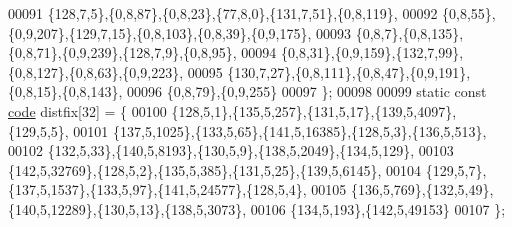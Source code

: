 \begin{DoxyCode}
00091         \{128,7,5\},\{0,8,87\},\{0,8,23\},\{77,8,0\},\{131,7,51\},\{0,8,119\},
00092         \{0,8,55\},\{0,9,207\},\{129,7,15\},\{0,8,103\},\{0,8,39\},\{0,9,175\},
00093         \{0,8,7\},\{0,8,135\},\{0,8,71\},\{0,9,239\},\{128,7,9\},\{0,8,95\},
00094         \{0,8,31\},\{0,9,159\},\{132,7,99\},\{0,8,127\},\{0,8,63\},\{0,9,223\},
00095         \{130,7,27\},\{0,8,111\},\{0,8,47\},\{0,9,191\},\{0,8,15\},\{0,8,143\},
00096         \{0,8,79\},\{0,9,255\}
00097     \};
00098 
00099     \textcolor{keyword}{static} \textcolor{keyword}{const} \hyperlink{structcode}{code} distfix[32] = \{
00100         \{128,5,1\},\{135,5,257\},\{131,5,17\},\{139,5,4097\},\{129,5,5\},
00101         \{137,5,1025\},\{133,5,65\},\{141,5,16385\},\{128,5,3\},\{136,5,513\},
00102         \{132,5,33\},\{140,5,8193\},\{130,5,9\},\{138,5,2049\},\{134,5,129\},
00103         \{142,5,32769\},\{128,5,2\},\{135,5,385\},\{131,5,25\},\{139,5,6145\},
00104         \{129,5,7\},\{137,5,1537\},\{133,5,97\},\{141,5,24577\},\{128,5,4\},
00105         \{136,5,769\},\{132,5,49\},\{140,5,12289\},\{130,5,13\},\{138,5,3073\},
00106         \{134,5,193\},\{142,5,49153\}
00107     \};
\end{DoxyCode}
